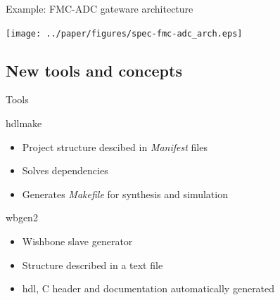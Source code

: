\documentclass[compress,red]{beamer}
\begin{document}
\begin{frame}{Example: FMC-ADC gateware architecture}

  \begin{center}
    \texttt{[image: ../paper/figures/spec-fmc-adc\_arch.eps]}
  \end{center}

\end{frame}

\subsection{New tools and concepts}

\begin{frame}{Tools}

  \begin{block}{hdlmake}
    \begin{itemize}
    \item
      Project structure descibed in \textit{Manifest} files
    \item
      Solves dependencies
    \item
      Generates \textit{Makefile} for synthesis and simulation
    \end{itemize}
  \end{block}

  \begin{block}{wbgen2}
    \begin{itemize}
    \item
      Wishbone slave generator
    \item
      Structure described in a text file
    \item
      hdl, C header and documentation automatically generated
    \end{itemize}
  \end{block}


\end{frame}
\end{document}
